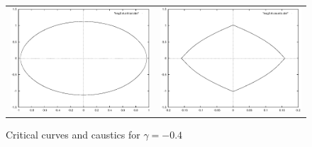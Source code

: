 \documentclass[aspectratio=1610,xcolor=dvipsnames,t]{beamer}
\begin{document}
    \begin{figure}
        \caption{Critical curves and caustics for $\gamma = -0.4$}
        \label{fig:critical-gamma-0-4}   
        \begin{center}
            \begin{tabular}{cc} 
                \includegraphics[width=\columnwidth]{images/neg0-4-critical.eps} &
                \includegraphics[width=\columnwidth]{images/neg0-4-caustic.eps} 
            \end{tabular} 
        \end{center}
    \end{figure} 
\end{document}
